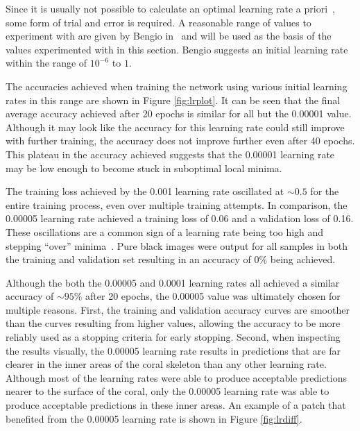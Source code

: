 Since it is usually not possible to calculate an optimal learning rate a priori~\cite{neuralbook}, some form of trial and error is required. A reasonable range of values to experiment with are given by Bengio in~\cite{bengio2012practical} and will be used as the basis of the values experimented with in this section. Bengio suggests an initial learning rate within the range of $10^{-6}$ to $1$.

The accuracies achieved when training the network using various initial learning rates in this range are shown in Figure \ref{fig:lrplot}. It can be seen that the final average accuracy achieved after 20 epochs is similar for all but the 0.00001 value. Although it may look like the accuracy for this learning rate could still improve with further training, the accuracy does not improve further even after 40 epochs. This plateau in the accuracy achieved suggests that the 0.00001 learning rate may be low enough to become stuck in suboptimal local minima.

The training loss achieved by the 0.001 learning rate oscillated at ${\sim}0.5$ for the entire training process, even over multiple training attempts. In comparison, the 0.00005 learning rate achieved a training loss of 0.06 and a validation loss of 0.16. These oscillations are a common sign of a learning rate being too high and stepping ``over'' minima~\cite{bishop1995neural}. Pure black images were output for all samples in both the training and validation set resulting in an accuracy of 0\% being achieved.

Although the both the 0.00005 and 0.0001 learning rates all achieved a similar accuracy of ${\sim}95\%$ after 20 epochs, the 0.00005 value was ultimately chosen for multiple reasons. First, the training and validation accuracy curves are smoother than the curves resulting from higher values, allowing the accuracy to be more reliably used as a stopping criteria for early stopping. Second, when inspecting the results visually, the 0.00005 learning rate results in predictions that are far clearer in the inner areas of the coral skeleton than any other learning rate. Although most of the learning rates were able to produce acceptable predictions nearer to the surface of the coral, only the 0.00005 learning rate was able to produce acceptable predictions in these inner areas. An example of a patch that benefited from the 0.00005 learning rate is shown in Figure \ref{fig:lrdiff}.

